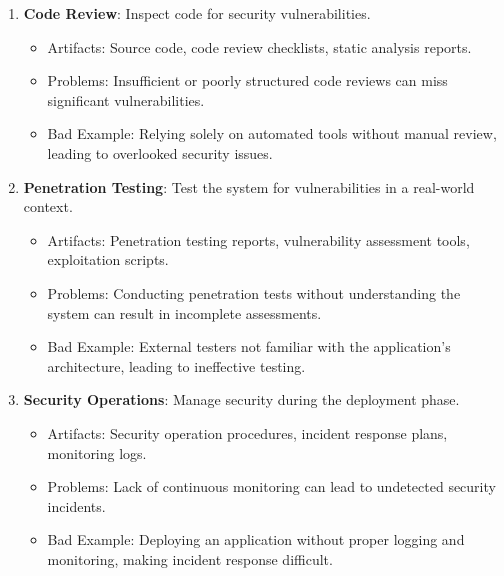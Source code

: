 {\begin{enumerate}
\begin{itemize}
                \item Problems: Inadequate testing of high-risk areas may leave critical vulnerabilities untested.
                \item Bad Example: Conducting extensive tests on low-risk features while neglecting authentication mechanisms.
            \end{itemize}
        \item \textbf{Code Review}: Inspect code for security vulnerabilities.
            \begin{itemize}
                \item Artifacts: Source code, code review checklists, static analysis reports.
                \item Problems: Insufficient or poorly structured code reviews can miss significant vulnerabilities.
                \item Bad Example: Relying solely on automated tools without manual review, leading to overlooked security issues.
            \end{itemize}
        \item \textbf{Penetration Testing}: Test the system for vulnerabilities in a real-world context.
            \begin{itemize}
                \item Artifacts: Penetration testing reports, vulnerability assessment tools, exploitation scripts.
                \item Problems: Conducting penetration tests without understanding the system can result in incomplete assessments.
                \item Bad Example: External testers not familiar with the application’s architecture, leading to ineffective testing.
            \end{itemize}
        \item \textbf{Security Operations}: Manage security during the deployment phase.
            \begin{itemize}
                \item Artifacts: Security operation procedures, incident response plans, monitoring logs.
                \item Problems: Lack of continuous monitoring can lead to undetected security incidents.
                \item Bad Example: Deploying an application without proper logging and monitoring, making incident response difficult.
            \end{itemize}
    \end{enumerate}
}

